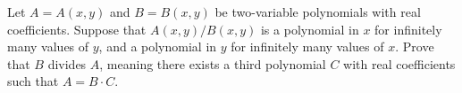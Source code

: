 Let $A = A(x,y)$ and $B = B(x,y)$ be two-variable polynomials with real coefficients. Suppose that $A(x,y)/B(x,y)$ is a polynomial in $x$ for infinitely many values of $y$, and a polynomial in $y$ for infinitely many values of $x$. Prove that $B$ divides $A$, meaning there exists a third polynomial $C$ with real coefficients such that $A = B \cdot C$.